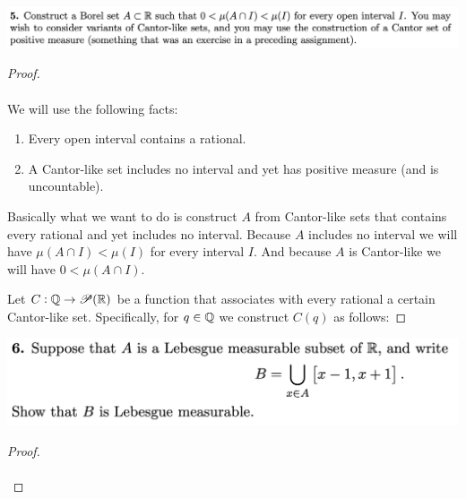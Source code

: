 \newpage
\begin{mdframed}
\includegraphics[width=400pt]{img/analysis--berkeley-202a-hw05-40cd.png}
\end{mdframed}

\begin{proof}~\\~\\
  We will use the following facts:
  \begin{enumerate}
  \item Every open interval contains a rational.
  \item A Cantor-like set includes no interval and yet has positive measure (and is uncountable).
  \end{enumerate}

  Basically what we want to do is construct $A$ from Cantor-like sets that contains every rational and yet
  includes no interval. Because $A$ includes no interval we will have $\mu(A \cap I) < \mu(I)$ for every
  interval $I$. And because $A$ is Cantor-like we will have $0 < \mu(A \cap I)$.

  Let $C: \mathbb{Q} \to \mathscr{P}(\mathbb{R})$ be a function that associates with every rational a certain Cantor-like set.
  Specifically, for $q \in \mathbb{Q}$ we construct $C(q)$ as follows:

\end{proof}

\newpage
\begin{mdframed}
\includegraphics[width=400pt]{img/analysis--berkeley-202a-hw05-3d2c.png}
\end{mdframed}

\begin{proof}~\\~\\

\end{proof}
